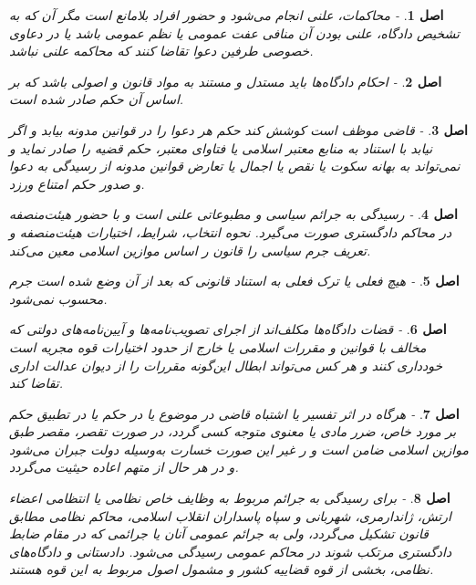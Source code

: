 \documentclass[12pt]{article}
\newtheorem{asl}{اصل}
\begin{document}
\begin{asl}- 
محاکمات، علنی انجام می‌شود و حضور افراد بلامانع است مگر آن که به تشخیص دادگاه، علنی بودن آن منافی عفت عمومی یا نظم عمومی باشد یا در دعاوی خصوصی طرفین دعوا تقاضا کنند که محاکمه علنی نباشد. 
\end{asl}

\begin{asl}- 
احکام دادگاه‌ها باید مستدل و مستند به مواد قانون و اصولی باشد که بر اساس آن حکم صادر شده است. 
\end{asl}

\begin{asl}- 
قاضی موظف است کوشش کند حکم هر دعوا را در قوانین مدونه بیابد و اگر نیابد با استناد به منابع معتبر اسلامی یا فتاوای معتبر، حکم قضیه را صادر نماید و نمی‌تواند به بهانه سکوت یا نقص یا اجمال یا تعارض قوانین مدونه از رسیدگی به دعوا و صدور حکم امتناع ورزد. 
\end{asl}

\begin{asl}- 
رسیدگی به جرائم سیاسی و مطبوعاتی علنی است و با حضور هیئت‌منصفه در محاکم دادگستری صورت می‌گیرد. نحوه انتخاب، شرایط، اختیارات هیئت‌منصفه و تعریف جرم سیاسی را قانون ر اساس موازین اسلامی معین می‌کند. 
\end{asl}

\begin{asl}- 
هیچ فعلی یا ترک فعلی به استناد قانونی که بعد از آن وضع شده است جرم محسوب نمی‌شود. 
\end{asl}

\begin{asl}- 
قضات دادگاه‌ها مکلف‌اند از اجرای تصویب‏‌نامه‌ها و آیین‌نامه‌های دولتی که مخالف با قوانین و مقررات اسلامی یا خارج از حدود اختیارات قوه مجریه است خودداری کنند و هر کس می‌تواند ابطال این‌گونه مقررات را از دیوان عدالت اداری تقاضا کند.  
\end{asl}

\begin{asl}- 
هرگاه در اثر تفسیر یا اشتباه قاضی در موضوع یا در حکم یا در تطبیق حکم بر مورد خاص، ضرر مادی یا معنوی متوجه کسی گردد، در صورت تقصر، مقصر طبق موازین اسلامی ضامن است و ر غیر این صورت خسارت به‌وسیله دولت جبران می‌شود و در هر حال از متهم اعاده حیثیت می‌گردد. 
\end{asl}

\begin{asl}- 
برای رسیدگی به جرائم مربوط به وظایف خاص نظامی یا انتظامی اعضاء ارتش، ژاندارمری، شهربانی و سپاه پاسداران انقلاب اسلامی، محاکم نظامی مطابق قانون تشکیل می‌گردد، ولی به جرائم عمومی آنان یا جرائمی که در مقام ضابط دادگستری مرتکب شوند در محاکم عمومی رسیدگی می‌شود. دادستانی و دادگاه‌های نظامی، بخشی از قوه قضاییه کشور و مشمول اصول مربوط به این قوه هستند.  
\end{asl}
\end{document}
